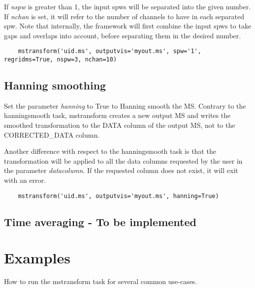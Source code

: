 If {\it nspw} is greater than 1, the input spws will be separated into the given
number. If {\it nchan} is set, it will refer to the number of channels to have in each
separated spw. Note that internally, the framework will first combine the input
spws to take gaps and overlaps into account, before separating them in the desired
number.

\begin{verbatim}
    mstransform('uid.ms', outputvis='myout.ms', spw='1', regridms=True, nspw=3, nchan=10)
\end{verbatim}

\subsection{Hanning smoothing}
Set the parameter {\it hanning} to True to Hanning smooth the MS. Contrary to the
hanningsmooth task, mstransform creates a new output MS and writes the smoothed transformation
to the DATA column of the output MS, not to the CORRECTED_DATA column.

Another difference with respect to the hanningsmooth task is that the transformation will be 
applied to all the data columns requested by the user in the parameter {\it datacolumn}. If the 
requested column does not exist, it will exit with an error. 

\begin{verbatim}
    mstransform('uid.ms', outputvis='myout.ms', hanning=True)
\end{verbatim}

\subsection{Time averaging - To be implemented}



\section{Examples}\label{Sec:Examples}
How to run the mstransform task for several common use-cases.

